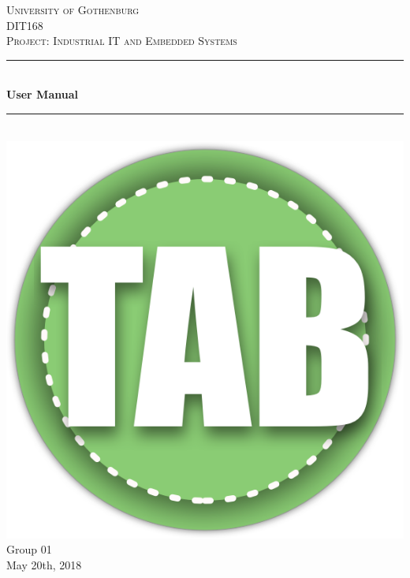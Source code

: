 \documentclass[12pt]{article}
\begin{document}
\begin{titlepage}

\newcommand{\Line}{\rule{\linewidth}{0.5mm}} 

\center
 
\textsc{\LARGE University of Gothenburg}
\\[3.5cm] 

\textsc{\Large DIT168}\\[0.3cm]
\textsc{\large Project: Industrial IT and Embedded Systems}\\[0.5cm]
\Line \\[0.4cm]
{\huge \bfseries User Manual}\\[0.4cm]
\Line \\[2cm]
 
\includegraphics[scale = 0.25]{Images/tab_logo.png}\\[2cm]	

{\large Group 01}\\
{\large May 20th, 2018}

\vfill
\end{titlepage}
\end{document}
